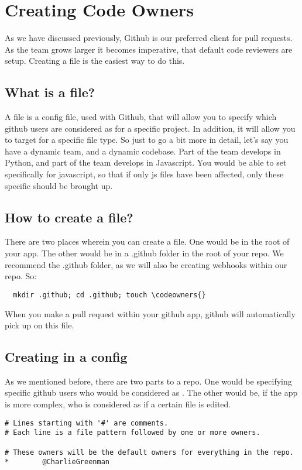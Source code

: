 \maketitle{}
\section{ Creating Code Owners }

As we have discussed previously, Github is our preferred client for pull
requests. As the team grows larger it becomes imperative, that default code
reviewers are setup. Creating a \codeowners{} file is the easiest way to do this.

\subsection{ What is a \codeowners{} file? }
A \codeowners{} file is a config file, used with Github, that will allow you to
specify which github users are considered as \codeowners{} for a specific project.
In addition, it will allow you to target \codeowners{} for a specific file type.
So just to go a bit more in detail, let's say you have a dynamic team, and a
dynamic codebase. Part of the team develops in Python, and part of the team
develops in Javascript. You would be able to set \codeowners{} specifically for
javascript, so that if only js files have been affected, only these specific
\codeowners{} should be brought up.

\subsection{ How to create a \codeowners{} file? }
There are two places wherein you can create a \codeowners{} file. One would be
in the root of your app. The other would be in a .github folder in the root of
your repo. We recommend the .github folder, as we will also be creating webhooks
within our repo. So:
\begin{verbatim}
  mkdir .github; cd .github; touch \codeowners{}
\end{verbatim}
When you make a pull request within your github app, github will automatically
pick up on this file.

\subsection{ Creating \codeowners{} in a \codeowners{} config }
As we mentioned before, there are two parts to a \codeowners{} repo. One would
be specifying specific github users who would be considered as \codeowners{}.
The other would be, if the app is more complex, who is considered as
\codeowners{} if a certain file is edited.

\begin{lstlisting}
# Lines starting with '#' are comments.
# Each line is a file pattern followed by one or more owners.

# These owners will be the default owners for everything in the repo.
*        @CharlieGreenman

\end{lstlisting}
